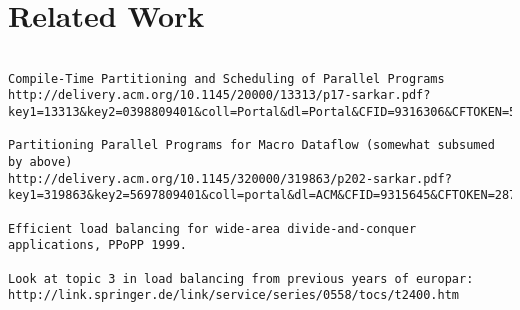 \section{Related Work}

\begin{verbatim}

Compile-Time Partitioning and Scheduling of Parallel Programs
http://delivery.acm.org/10.1145/20000/13313/p17-sarkar.pdf?key1=13313&key2=0398809401&coll=Portal&dl=Portal&CFID=9316306&CFTOKEN=51649022

Partitioning Parallel Programs for Macro Dataflow (somewhat subsumed by above)
http://delivery.acm.org/10.1145/320000/319863/p202-sarkar.pdf?key1=319863&key2=5697809401&coll=portal&dl=ACM&CFID=9315645&CFTOKEN=28761144

Efficient load balancing for wide-area divide-and-conquer
applications, PPoPP 1999.

Look at topic 3 in load balancing from previous years of europar:
http://link.springer.de/link/service/series/0558/tocs/t2400.htm

\end{verbatim}